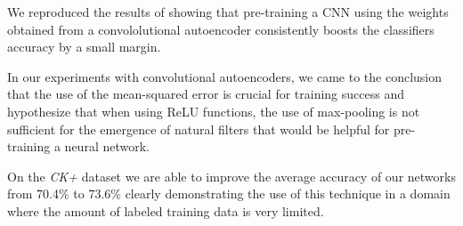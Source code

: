 \documentclass{article}
\begin{document}
  We reproduced the results of \citep{masci2011stacked} showing that pre-training a CNN using the weights obtained from a convololutional autoencoder consistently boosts the classifiers accuracy by a small margin. 

  In our experiments with convolutional autoencoders, we came to the conclusion that the use of the mean-squared error is crucial for training success and hypothesize that when using ReLU functions, the use of max-pooling is not sufficient for the emergence of natural filters that would be helpful for pre-training a neural network. 

  On the \emph{CK+} dataset we are able to improve the average accuracy of our networks from 70.4\% to 73.6\% clearly demonstrating the use of this technique in a domain where the amount of labeled training data is very limited. 



\clearpage
%
\printbibliography
\end{document}
